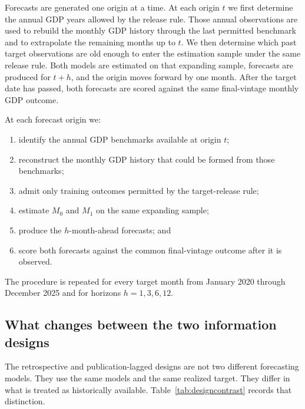 \documentclass[preprint,12pt,authoryear]{elsarticle}
\begin{document}
Forecasts are generated one origin at a time. At each origin $t$ we first determine the annual GDP years allowed by the release rule. Those annual observations are used to rebuild the monthly GDP history through the last permitted benchmark and to extrapolate the remaining months up to $t$. We then determine which past target observations are old enough to enter the estimation sample under the same release rule. Both models are estimated on that expanding sample, forecasts are produced for $t+h$, and the origin moves forward by one month. After the target date has passed, both forecasts are scored against the same final-vintage monthly GDP outcome.

At each forecast origin we:
\begin{enumerate}
\item identify the annual GDP benchmarks available at origin $t$;
\item reconstruct the monthly GDP history that could be formed from those benchmarks;
\item admit only training outcomes permitted by the target-release rule;
\item estimate $M_0$ and $M_1$ on the same expanding sample;
\item produce the $h$-month-ahead forecasts; and
\item score both forecasts against the common final-vintage outcome after it is observed.
\end{enumerate}
The procedure is repeated for every target month from January 2020 through December 2025 and for horizons $h=1,3,6,12$.

\subsection{What changes between the two information designs}

The retrospective and publication-lagged designs are not two different forecasting models. They use the same models and the same realized target. They differ in what is treated as historically available. Table~\ref{tab:designcontrast} records that distinction.
\end{document}

